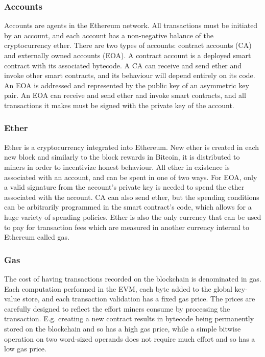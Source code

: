 \subsubsection{Accounts}
Accounts are agents in the Ethereum network. All transactions must be initiated by an account, and each account has a non-negative balance of the cryptocurrency ether. There are two types of accounts: contract accounts (CA) and externally owned accounts (EOA). A contract account is a deployed smart contract with its associated bytecode. A CA can receive and send ether and invoke other smart contracts, and its behaviour will depend entirely on its code. An EOA is addressed and represented by the public key of an asymmetric key pair. An EOA can receive and send ether and invoke smart contracts, and all transactions it makes must be signed with the private key of the account. 

\subsubsection{Ether}
Ether is a cryptocurrency integrated into Ethereum. New ether is created in each new block and similarly to the block rewards in Bitcoin, it is distributed to miners in order to incentivize honest behaviour. All ether in existence is associated with an account, and can be spent in one of two ways. For EOA, only a valid signature from the account's private key is needed to spend the ether associated with the account. CA can also send ether, but the spending conditions can be arbitrarily programmed in the smart contract's code, which allows for a huge variety of spending policies. Ether is also the only currency that can be used to pay for transaction fees which are measured in another currency internal to Ethereum called gas.

\subsubsection{Gas}
The cost of having transactions recorded on the blockchain is denominated in gas. Each computation performed in the EVM, each byte added to the global key-value store, and each transaction validation has a fixed gas price. The prices are carefully designed to reflect the effort miners consume by processing the transaction. E.g. creating a new contract results in bytecode being permanently stored on the blockchain and so has a high gas price, while a simple bitwise operation on two word-sized operands does not require much effort and so has a low gas price.

